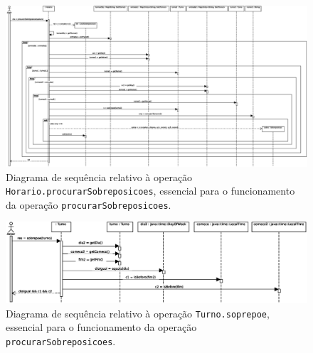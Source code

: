 \documentclass[12pt, a4paper]{article}
\begin{document}
\begin{landscape}
        \vspace*{\fill}
        \pagebreak
        \vspace*{\fill}

        \begin{figure}[H]
            \centering
            \includegraphics[scale=0.55]{Imagens/Modelos/procurarSobreposicoesHorario.svg.eps}
            \caption{
                Diagrama de sequência relativo à operação \texttt{Horario.procurarSobreposicoes},
                essencial para o funcionamento da operação \texttt{procurarSobreposicoes}.
            }
        \end{figure}

        \vspace*{\fill}
        \pagebreak
        \vspace*{\fill}

        \begin{figure}[H]
            \centering
            \includegraphics[scale=0.95]{Imagens/Modelos/procurarSobreposicoesTurno.svg.eps}
            \caption{
                Diagrama de sequência relativo à operação \texttt{Turno.soprepoe}, essencial para o
                funcionamento da operação \texttt{procurarSobreposicoes}.
            }
        \end{figure}

        \vspace*{\fill}
        \pagebreak
        \vspace*{\fill}


\end{landscape}
\end{document}
